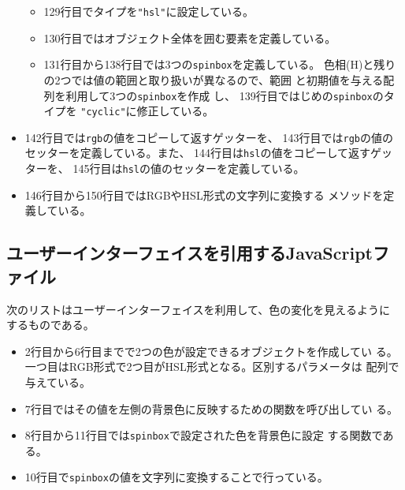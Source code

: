 \begin{itemize}
\begin{itemize}
				\item 129行目でタイプを\texttt{"hsl"}に設定している。
				\item 130行目ではオブジェクト全体を囲む要素を定義している。
				\item 131行目から138行目では3つの\texttt{spinbox}を定義している。
							色相(H)と残りの2つでは値の範囲と取り扱いが異なるので、範囲
							と初期値を与える配列を利用して3つの\texttt{spinbox}を作成
							し、
							139行目ではじめの\texttt{spinbox}のタイプを
							\texttt{"cyclic"}に修正している。
			 \end{itemize}
 \item 142行目では\texttt{rgb}の値をコピーして返すゲッターを、
 143行目では\texttt{rgb}の値のセッターを定義している。また、
			 144行目は\texttt{hsl}の値をコピーして返すゲッターを、
 145行目は\texttt{hsl}の値のセッターを定義している。
 \item 146行目から150行目ではRGBやHSL形式の文字列に変換する
			 メソッドを定義している。
\end{itemize}
 \subsection{ユーザーインターフェイスを引用するJavaScriptファイル}
 次のリストはユーザーインターフェイスを利用して、色の変化を見えるように
 するものである。
 \begin{itemize}
	\item 2行目から6行目までで2つの色が設定できるオブジェクトを作成してい
				る。一つ目はRGB形式で2つ目がHSL形式となる。区別するパラメータは
				配列で与えている。
	\item 7行目ではその値を左側の背景色に反映するための関数を呼び出してい
				る。
	\item 8行目から11行目では\texttt{spinbox}で設定された色を背景色に設定
				する関数である。
	\item 10行目で\texttt{spinbox}の値を文字列に変換することで行っている。
 \end{itemize}